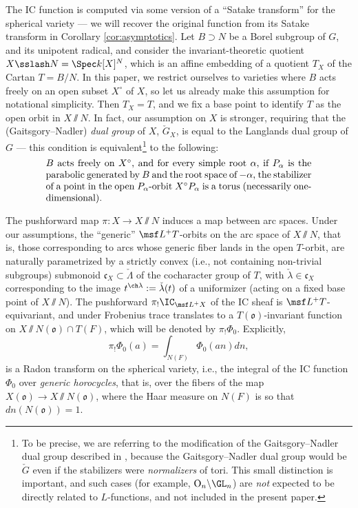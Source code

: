 \documentclass[final]{amsart}
\theoremstyle{remark}
\theoremstyle{definition}
\numberwithin{equation}{section}
\begin{document}
The IC function is computed via some version of a ``Satake transform'' for the spherical variety --- we will recover the original function from its Satake transform in Corollary \ref{cor:asymptotics}. Let $B\supset N$ be a Borel subgroup of $G$, and its unipotent radical, and consider the invariant-theoretic quotient $X\sslash N = \Spec k[X]^N$, which is an affine embedding of a quotient $T_X$ of the Cartan $T=B/N$. In this paper, we restrict ourselves to varieties where $B$ acts freely on an open subset $X^\circ$ of $X$, so let us already make this assumption for notational simplicity. Then $T_X=T$, and we fix a base point to identify $T$ as the open orbit in $X\sslash N$. In fact, our assumption on $X$ is stronger, requiring that the (Gaitsgory--Nadler) \emph{dual group} of $X$, $\check G_X$, is equal to the Langlands dual group of $G$ --- this condition is equivalent\footnote{To be precise, we are referring to the modification of the Gaitsgory--Nadler dual group described in \cite{SV}, because the Gaitsgory--Nadler dual group would be $\check G$ even if the stabilizers were \emph{normalizers} of tori. This small distinction is important, and such cases (for example, $\mathrm{O}_n\backslash \GL_n$) are \emph{not} expected to be directly related to $L$-functions, and not included in the present paper.} to the following:
\begin{equation}
\label{equation-typeT}
\parbox{0.8\linewidth}{$B$ acts freely on $X^\circ$, and for every simple root $\alpha$, if $P_\alpha$ is the parabolic generated by $B$ and the root space of $-\alpha$, the stabilizer of a point in the open $P_\alpha$-orbit $X^\circ P_\alpha$ is a torus (necessarily one-dimensional).}
\end{equation}

The pushforward map $\pi: X\to X\sslash N$ induces a map between arc spaces. Under our assumptions, the ``generic'' $\msf L^+T$-orbits on the arc space of $X\sslash N$, that is, those corresponding to arcs whose generic fiber lands in the open $T$-orbit, are naturally parametrized by a strictly convex (i.e., not containing non-trivial subgroups) submonoid $\mathfrak c_X\subset \check\Lambda$ of the cocharacter group of $T$, with $\check\lambda\in\mathfrak c_X$ corresponding to the image $t^{\ch\lambda}:=\check\lambda(t)$ of a uniformizer (acting on a fixed base point of $X\sslash N$). The pushforward $\pi_! \IC_{\msf L^+X}$ of the IC sheaf is $\msf L^+T$-equivariant, and under Frobenius trace translates to a $T(\mathfrak o)$-invariant function on $X\sslash N (\mathfrak o) \cap T(F)$, which will be denoted by $\pi_! \Phi_0$. Explicitly, 
\[ \pi_! \Phi_0 (a) = \int_{N(F)} \Phi_0(an) dn,\] 
is a Radon transform on the spherical variety, i.e., the integral of the IC function $\Phi_0$ over \emph{generic horocycles}, that is, over the fibers of the map $X(\mathfrak o)\to X\sslash N(\mathfrak o)$, where the Haar measure on $N(F)$ is so that $dn(N(\mathfrak o))=1$. 
\end{document}
